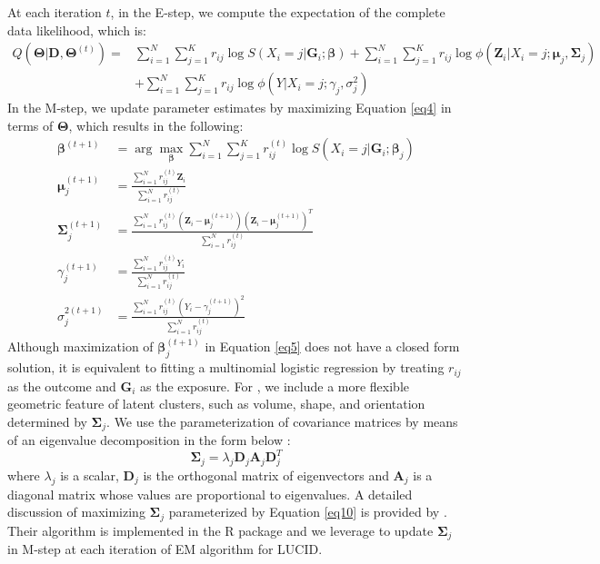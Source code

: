 At each iteration $t$, in the E-step, we compute the expectation of the complete data likelihood, which is:
\begin{equation}
    \begin{aligned}
        Q(\bm{\Theta}|\bm{D}, \bm{\Theta}^{(t)}) = & \sum_{i=1}^N\sum_{j=1}^K r_{ij} \log S\left(X_i = j|\bm{G}_i;\bm{\beta}\right) + \sum_{i=1}^N\sum_{j=1}^K r_{ij} \log \phi(\bm{Z}_i|X_i = j;\bm{\mu}_j, \bm{\Sigma}_j) \\
        & + \sum_{i=1}^N\sum_{j=1}^K r_{ij} \log \phi\left(Y|X_i = j; \gamma_j, \sigma_j^2\right)
    \end{aligned}
    \label{eq4}
\end{equation}
In the M-step, we update parameter estimates by maximizing Equation \ref{eq4} in terms of $\bm \Theta$, which results in the following:
\begin{align}
    \bm \beta^{(t+1)} & = \arg \max_{\bm \beta} \sum_{i=1}^N \sum_{j=1}^K r_{ij}^{(t)} \log S(X_i = j| \bm G_i; \bm \beta_j) \label{eq5} \\
    \bm \mu_j^{(t+1)} & = \frac{\sum_{i=1}^N r_{ij}^{(t)}\bm Z_i}{\sum_{i=1}^N r_{ij}^{(t)}} \label{eq6} \\
    \bm \Sigma_j^{(t+1)} & = \frac{\sum_{i=1}^N r_{ij}^{(t)} \left(\bm{Z}_i - \bm{\mu}_j^{(t+1)} \right) \left(\bm{Z}_i - \bm{\mu}_j^{(t+1)} \right)^T}{\sum_{i=1}^N r_{ij}^{(t)}} \label{eq7} \\
    \gamma_j^{(t+1)} & = \frac{\sum_{i=1}^N r_{ij}^{(t)}Y_i}{\sum_{i=1}^N r_{ij}^{(t)}} \label{eq8} \\
    \sigma_j^{2(t+1)} & = \frac{\sum_{i=1}^N r_{ij}^{(t)} \left(Y_i - \gamma_j^{(t+1)} \right)^2}{\sum_{i=1}^N r_{ij}^{(t)}} \label{eq9}
\end{align}
Although maximization of $\bm \beta_j^{(t+1)}$ in Equation \ref{eq5} does not have a closed form solution, it is equivalent to fitting a multinomial logistic regression by treating $r_{ij}$ as the outcome and $\bm G_i$ as the exposure.
For , we include a more flexible geometric feature of latent clusters, such as volume, shape, and orientation determined by $\bm \Sigma_j$.  We use the parameterization of covariance matrices by means of an eigenvalue decomposition in the form below \citep{banfield1993model}:
\begin{equation}
    \boldsymbol{\Sigma}_j = \lambda_j \boldsymbol{D}_j  \boldsymbol{A}_j \boldsymbol{D}_j^T \label{eq10}
\end{equation}
where $\lambda_j$ is a scalar, $\bm D_j$ is the orthogonal matrix of eigenvectors and $\bm A_j$ is a diagonal matrix whose values are proportional to eigenvalues. A detailed discussion of maximizing $\bm \Sigma_j$ parameterized by Equation \ref{eq10} is provided by \citet{celeux1995gaussian}. Their algorithm is implemented in the R package  \citep{scrucca2016mclust} and we leverage  to update $\bm \Sigma_j$ in M-step at each iteration of EM algorithm for LUCID.
